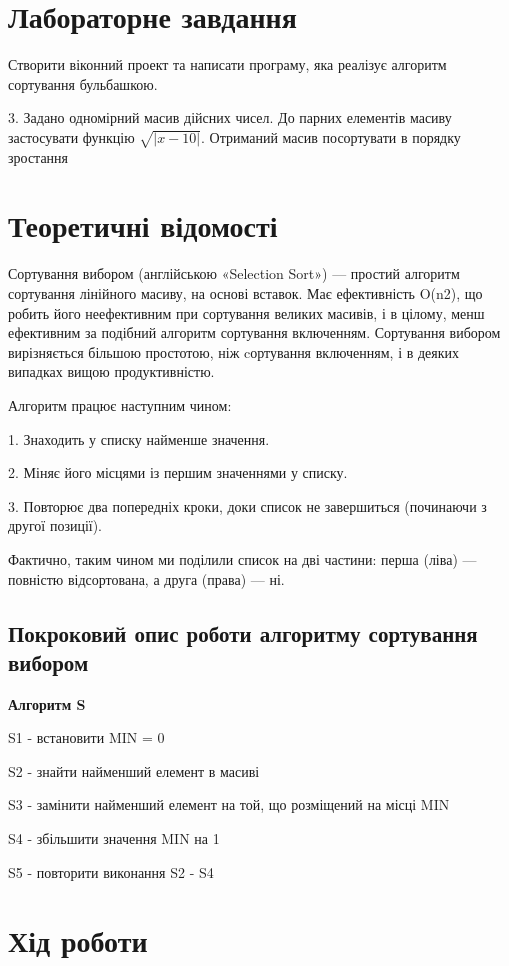 \documentclass{article}
\begin{document}
\begin{normalsize}
		\section*{Лабораторне завдання}
		Створити віконний проект та написати програму, яка реалізує алгоритм сортування бульбашкою.
		\begin{center}
			3. Задано одномірний масив дійсних чисел. До парних елементів масиву застосувати функцію $\sqrt{|x-10|}$. Отриманий масив посортувати в порядку зростання
		\end{center}
		
		\section*{Теоретичні відомості}
		Сортування вибором (англійською «Selection Sort») — простий алгоритм сортування лінійного масиву, на основі вставок. Має ефективність O(n2), що робить його неефективним при сортування великих масивів, і в цілому, менш ефективним за подібний алгоритм сортування включенням. Сортування вибором вирізняється більшою простотою, ніж cортування включенням, і в деяких випадках вищою продуктивністю.
		
		Алгоритм працює наступним чином:
		
		1.     Знаходить у списку найменше значення.
		
		2.     Міняє його місцями із першим значеннями у списку.
		
		3.     Повторює два попередніх кроки, доки список не завершиться (починаючи з другої позиції).
		
		Фактично, таким чином ми поділили список на дві частини: перша (ліва) — повністю відсортована, а друга (права) — ні.
		
		\subsection*{Покроковий опис роботи алгоритму сортування вибором}
		\textbf{Алгоритм S}
		
		S1 - встановити MIN = 0
		
		S2 - знайти найменший елемент в масиві
		
		S3 - замінити найменший елемент на той, що розміщений на місці MIN
		
		S4 - збільшити значення MIN на 1
		
		S5 - повторити виконання S2 - S4
		
		
		\section*{Хід роботи}

\end{normalsize}
\end{document}
